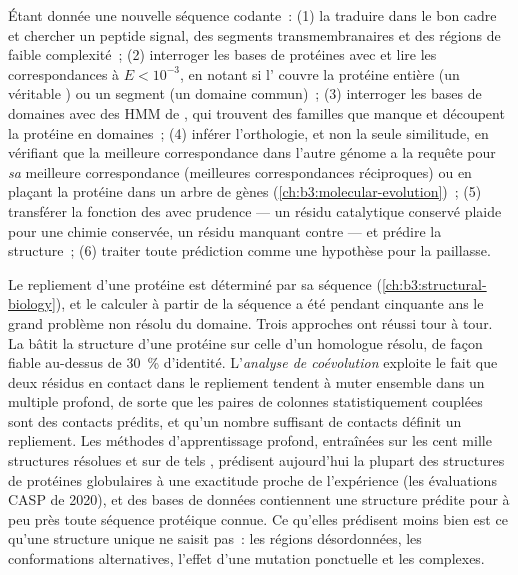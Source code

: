 \begin{method}\label{met:b3:bioinformatics:annotate}
Étant donnée une nouvelle séquence codante~: (1) la traduire dans le
bon cadre et chercher un peptide signal, des segments transmembranaires
et des régions de faible complexité~; (2) interroger les bases de
protéines avec  et lire les correspondances à $E < 10^{-3}$, en
notant si l' couvre la protéine entière (un véritable
) ou un segment (un domaine commun)~; (3) interroger les
bases de domaines avec des HMM de , qui trouvent des familles que
 manque et découpent la protéine en domaines~; (4) inférer
l'orthologie, et non la seule similitude, en vérifiant que la meilleure
correspondance dans l'autre génome a la requête pour \emph{sa} meilleure
correspondance (meilleures correspondances réciproques) ou en plaçant la
protéine dans un arbre de gènes (\cref{ch:b3:molecular-evolution})~;
(5) transférer la fonction des  avec prudence --- un résidu
catalytique conservé plaide pour une chimie conservée, un résidu
manquant contre --- et prédire la structure~; (6) traiter toute
prédiction comme une hypothèse pour la paillasse.
\end{method}

\begin{proposition}\label{prop:b3:bioinformatics:structure}
Le repliement d'une protéine est déterminé par sa séquence
(\cref{ch:b3:structural-biology}), et le calculer à partir de la
séquence a été pendant cinquante ans le grand problème non résolu du
domaine. Trois approches ont réussi tour à tour. La \emph{} bâtit la structure d'une protéine sur celle d'un
homologue résolu, de façon fiable au-dessus de \qty{30}{\%} d'identité.
L'\emph{analyse de coévolution} exploite le fait que deux résidus en
contact dans le repliement tendent à muter ensemble dans un 
multiple profond, de sorte que les paires de colonnes statistiquement
couplées sont des contacts prédits, et qu'un nombre suffisant de
contacts définit un repliement. Les méthodes d'apprentissage profond,
entraînées sur les cent mille structures résolues et sur de tels
, prédisent aujourd'hui la plupart des structures de
protéines globulaires à une exactitude proche de l'expérience (les
évaluations CASP de 2020), et des bases de données contiennent une
structure prédite pour à peu près toute séquence protéique connue. Ce
qu'elles prédisent moins bien est ce qu'une structure unique ne saisit
pas~: les régions désordonnées, les conformations alternatives, l'effet
d'une mutation ponctuelle et les complexes.
\end{proposition}

